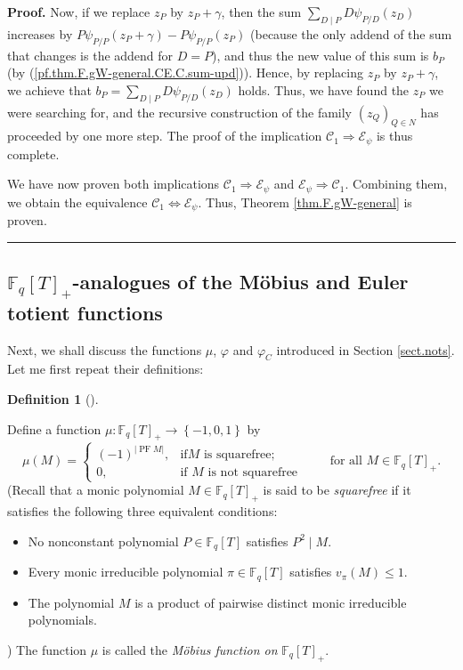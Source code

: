 \documentclass[numbers=enddot,12pt,final,onecolumn,notitlepage]{scrartcl}%
\theoremstyle{definition}
\newtheorem{defi}[theo]{Definition}
\newenvironment{definition}[1][]
{\begin{defi}[#1]\begin{leftbar}}
{\end{leftbar}\end{defi}}
\newenvironment{proof}[1][Proof]{\noindent\textbf{#1.} }{\ \rule{0.5em}{0.5em}}
\let\sumnonlimits\sum
\renewcommand{\sum}{\sumnonlimits\limits}
\begin{document}
\begin{proof}
Now, if we replace $z_{P}$ by $z_{P}+\gamma$, then the sum $\sum_{D\mid
P}D\psi_{P/D}\left(  z_{D}\right)  $ increases by $P\psi_{P/P}\left(
z_{P}+\gamma\right)  -P\psi_{P/P}\left(  z_{P}\right)  $ (because the only
addend of the sum that changes is the addend for $D=P$), and thus the new
value of this sum is $b_{P}$ (by (\ref{pf.thm.F.gW-general.CE.C.sum-upd})).
Hence, by replacing $z_{P}$ by $z_{P}+\gamma$, we achieve that $b_{P}%
=\sum_{D\mid P}D\psi_{P/D}\left(  z_{D}\right)  $ holds. Thus, we have found
the $z_{P}$ we were searching for, and the recursive construction of the
family $\left(  z_{Q}\right)  _{Q\in N}$ has proceeded by one more step. The
proof of the implication $\mathcal{C}_{1}\Longrightarrow\mathcal{E}_{\psi}$ is
thus complete.

We have now proven both implications $\mathcal{C}_{1}\Longrightarrow
\mathcal{E}_{\psi}$ and $\mathcal{E}_{\psi}\Longrightarrow\mathcal{C}_{1}$.
Combining them, we obtain the equivalence $\mathcal{C}_{1}\Longleftrightarrow
\mathcal{E}_{\psi}$. Thus, Theorem \ref{thm.F.gW-general} is proven.
\end{proof}

\subsection{\label{subsect.proofs.numthefuns}$\mathbb{F}_{q}\left[  T\right]
_{+}$-analogues of the M\"{o}bius and Euler totient functions}

Next, we shall discuss the functions $\mu$, $\varphi$ and $\varphi_{C}$
introduced in Section \ref{sect.nots}. Let me first repeat their definitions:

\begin{definition}
\label{def.moebius-q}Define a function $\mu:\mathbb{F}_{q}\left[  T\right]
_{+}\rightarrow\left\{  -1,0,1\right\}  $ by%
\[
\mu\left(  M\right)  =%
\begin{cases}
\left(  -1\right)  ^{\left\vert \operatorname*{PF}M\right\vert }, & \text{if
}M\text{ is squarefree;}\\
0, & \text{if }M\text{ is not squarefree}%
\end{cases}
\ \ \ \ \ \ \ \ \ \ \text{for all }M\in\mathbb{F}_{q}\left[  T\right]  _{+}.
\]
(Recall that a monic polynomial $M\in\mathbb{F}_{q}\left[  T\right]  _{+}$ is
said to be \textit{squarefree} if it satisfies the following three equivalent conditions:

\begin{itemize}
\item No nonconstant polynomial $P\in\mathbb{F}_{q}\left[  T\right]  $
satisfies $P^{2}\mid M$.

\item Every monic irreducible polynomial $\pi\in\mathbb{F}_{q}\left[
T\right]  $ satisfies $v_{\pi}\left(  M\right)  \leq1$.

\item The polynomial $M$ is a product of pairwise distinct monic irreducible polynomials.
\end{itemize}

) The function $\mu$ is called the \textit{M\"{o}bius function on }%
$\mathbb{F}_{q}\left[  T\right]  _{+}$.
\end{definition}
\end{document}
